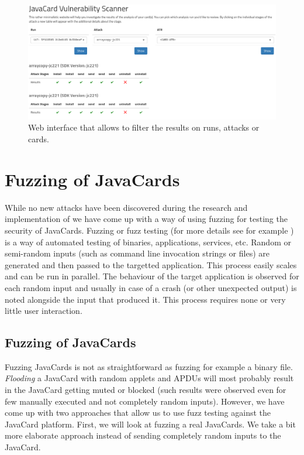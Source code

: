 \documentclass{../llncs/llncs}
\begin{document}
    \begin{figure}[htb]
        \centering
        \includegraphics[width=\textwidth]{src/imgs/web-app-all.png}
        \caption{Web interface that allows to filter the results on runs, attacks or cards.\label{fig:web-interface-pic}}
    \end{figure}
\section{Fuzzing of JavaCards\label{sec:fuzzing}}
While no new attacks have been discovered during the research and implementation of \projectname we have come up with a way of using fuzzing for testing the security of JavaCards. Fuzzing or fuzz testing (for more details see for example \cite{ossfuzz}) is a way of automated testing of binaries, applications, services, etc. Random or semi-random inputs (such as command line invocation strings or files) are generated and then passed to the targetted application. This process easily scales and can be run in parallel. The behaviour of the target application is observed for each random input and usually in case of a crash (or other unexpected output) is noted alongside the input that produced it. This process requires none or very little user interaction.

    \subsection{Fuzzing of JavaCards}
    Fuzzing JavaCards is not as straightforward as fuzzing for example a binary file. \textit{Flooding} a JavaCard with random applets and APDUs will most probably result in the JavaCard getting muted or blocked (such results were observed even for few manually executed and not completely random inputs). However, we have come up with two approaches that allow us to use fuzz testing against the JavaCard platform. First, we will look at fuzzing a real JavaCards. We take a bit more elaborate approach instead of sending completely random inputs to the JavaCard.
\end{document}
